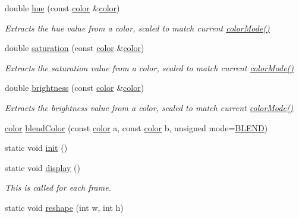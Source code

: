 \begin{DoxyCompactItemize}
double \hyperlink{namespacecprocessing_aac8de1d2f07f4736e63081ef536e8b67}{hue} (const \hyperlink{classcprocessing_1_1color}{color} \&\hyperlink{classcprocessing_1_1color}{color})
\begin{DoxyCompactList}\small\item\em \-Extracts the hue value from a color, scaled to match current \hyperlink{namespacecprocessing_aa2b11af6c6cb096d02a9fb39b6f5a54d}{color\-Mode()} \end{DoxyCompactList}\item 
double \hyperlink{namespacecprocessing_af0da26f695cba41e019675886efab315}{saturation} (const \hyperlink{classcprocessing_1_1color}{color} \&\hyperlink{classcprocessing_1_1color}{color})
\begin{DoxyCompactList}\small\item\em \-Extracts the saturation value from a color, scaled to match current \hyperlink{namespacecprocessing_aa2b11af6c6cb096d02a9fb39b6f5a54d}{color\-Mode()} \end{DoxyCompactList}\item 
double \hyperlink{namespacecprocessing_aed4f50cfde420a3f42922bbf2b7cbf99}{brightness} (const \hyperlink{classcprocessing_1_1color}{color} \&\hyperlink{classcprocessing_1_1color}{color})
\begin{DoxyCompactList}\small\item\em \-Extracts the brightness value from a color, scaled to match current \hyperlink{namespacecprocessing_aa2b11af6c6cb096d02a9fb39b6f5a54d}{color\-Mode()} \end{DoxyCompactList}\item 
\hyperlink{classcprocessing_1_1color}{color} \hyperlink{namespacecprocessing_a516a53b120765fdff7ecfc9130161e4c}{blend\-Color} (const \hyperlink{classcprocessing_1_1color}{color} a, const \hyperlink{classcprocessing_1_1color}{color} b, unsigned mode=\hyperlink{namespacecprocessing_aa210740653d5e2431db0bdc726242fb0a3d9a0443c8bb0e322801ca6a30dc947c}{\-B\-L\-E\-N\-D})
\item 
static void \hyperlink{namespacecprocessing_aedf10deb692c297efc2503be0912ed80}{init} ()
\item 
static void \hyperlink{namespacecprocessing_af7b4aa3cb0e99e28bb594e3ae3902f7e}{display} ()
\begin{DoxyCompactList}\small\item\em \-This is called for each frame. \end{DoxyCompactList}\item 
static void \hyperlink{namespacecprocessing_a9e2516066ff21ddde9ccc8d64cf0455c}{reshape} (int w, int h)

\end{DoxyCompactItemize}
